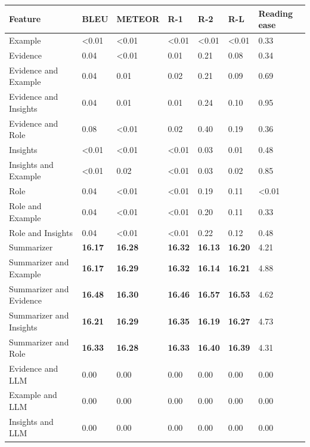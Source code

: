 \begin{tabular}{|l|l|l|l|l|l|l|}
\hline
\textbf{Feature} & BLEU & METEOR & R-1 & R-2 & R-L & Reading ease \\
 \hline
 Example & \textless{}0.01 & \textless{}0.01 & \textless{}0.01 & \textless{}0.01 & \textless{}0.01 & 0.33 \\
 \hline
 Evidence & 0.04 & \textless{}0.01 & 0.01 & 0.21 & 0.08 & 0.34 \\
 \hline
 Evidence and Example & 0.04 & 0.01 & 0.02 & 0.21 & 0.09 & 0.69 \\
 \hline
 Evidence and Insights & 0.04 & 0.01 & 0.01 & 0.24 & 0.10 & 0.95 \\
 \hline
 Evidence and Role & 0.08 & \textless{}0.01 & 0.02 & 0.40 & 0.19 & 0.36 \\
 \hline
 Insights & \textless{}0.01 & \textless{}0.01 & \textless{}0.01 & 0.03 & 0.01 & 0.48 \\
 \hline
 Insights and Example & \textless{}0.01 & 0.02 & \textless{}0.01 & 0.03 & 0.02 & 0.85 \\
 \hline
 Role & 0.04 & \textless{}0.01 & \textless{}0.01 & 0.19 & 0.11 & \textless{}0.01 \\
 \hline
 Role and Example & 0.04 & \textless{}0.01 & \textless{}0.01 & 0.20 & 0.11 & 0.33 \\
 \hline
 Role and Insights & 0.04 & \textless{}0.01 & \textless{}0.01 & 0.22 & 0.12 & 0.48 \\
 \hline
 Summarizer & \textbf{16.17} & \textbf{16.28} & \textbf{16.32} & \textbf{16.13} & \textbf{16.20} & 4.21 \\
 \hline
 Summarizer and Example & \textbf{16.17} & \textbf{16.29} & \textbf{16.32} & \textbf{16.14} & \textbf{16.21} & 4.88 \\
 \hline
 Summarizer and Evidence & \textbf{16.48} & \textbf{16.30} & \textbf{16.46} & \textbf{16.57} & \textbf{16.53} & 4.62 \\
 \hline
 Summarizer and Insights & \textbf{16.21} & \textbf{16.29} & \textbf{16.35} & \textbf{16.19} & \textbf{16.27} & 4.73 \\
 \hline
 Summarizer and Role & \textbf{16.33} & \textbf{16.28} & \textbf{16.33} & \textbf{16.40} & \textbf{16.39} & 4.31 \\
 \hline
 Evidence and LLM & 0.00 & 0.00 & 0.00 & 0.00 & 0.00 & 0.00 \\
 \hline
 Example and LLM & 0.00 & 0.00 & 0.00 & 0.00 & 0.00 & 0.00 \\
 \hline
 Insights and LLM & 0.00 & 0.00 & 0.00 & 0.00 & 0.00 & 0.00 \\

\end{tabular}
